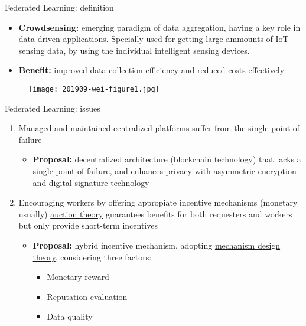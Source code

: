 \begin{frame}{Federated Learning: definition}
  \begin{itemize}
  \item \textbf{Crowdsensing:} emerging paradigm of data aggregation\cite{paper1}, having a key role in data-driven applications. Specially used for getting large ammounts of IoT sensing data, by using the individual intelligent sensing devices.
  \item \textbf{Benefit:} improved data collection efficiency and reduced costs effectively\cite{paper2}
  \end{itemize}
  \begin{figure}[h]
        \centering
        \texttt{[image: 201909-wei-figure1.jpg]}
      \end{figure}
\end{frame}

\begin{frame}{Federated Learning: issues}
  		\begin{enumerate}
   			\item Managed and maintained \alert{centralized platforms} suffer from the single point of failure
   				\begin{itemize}
   					\item \textbf{Proposal: } decentralized architecture (blockchain technology) that lacks a single point of failure, and enhances privacy with asymmetric encryption and digital signature technology
   				\end{itemize}
    		\item Encouraging workers by offering appropiate \alert{incentive mechanisms} (monetary usually) \rightarrow  \underline{auction theory} guarantees benefits for both requesters and workers\cite{paper15} but only provide short-term incentives
    			\begin{itemize}
   					\item \textbf{Proposal:} hybrid incentive mechanism, adopting \underline{mechanism design theory}, considering three factors:
   					\begin{itemize}
   					\item Monetary reward
   					\item Reputation evaluation
   					\item Data quality
   					\end{itemize}
   				\end{itemize}
  		\end{enumerate}
\end{frame}

